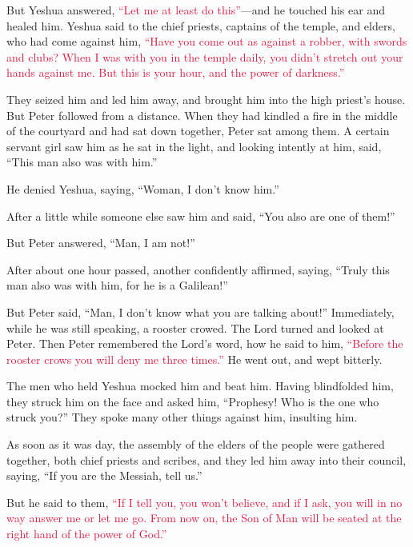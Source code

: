\myverse{}But Yeshua answered,
\textcolor{crimson}{“Let me at least do this”}—and he touched his ear and healed him.
\myverse{}Yeshua said to the chief priests, captains of the temple, and elders, who
had come against him,
\textcolor{crimson}{“Have you come out as against a robber, with swords and clubs?
}
\myverse{}\textcolor{crimson}{When I was with you in the temple daily, you didn’t stretch out your
	hands against me. But this is your hour, and the power of darkness.”
}

\myverse{}They seized him and led him away, and brought him into the high
priest’s house. But Peter followed from a distance.
\myverse{}When they had kindled a fire in the middle of the courtyard and had sat down
together, Peter sat among them.
\myverse{}A certain servant girl saw him as he sat in the light, and looking intently
at him, said, “This man also was with him.”

\myverse{}He denied Yeshua, saying, “Woman, I don’t know him.”

\myverse{}After a little while someone else saw him and said, “You also
are one of them!”

But Peter answered, “Man, I am not!”

\myverse{}After about one hour passed, another confidently affirmed, saying,
“Truly this man also was with him, for he is a Galilean!”

\myverse{}But Peter said, “Man, I don’t know what you are talking about!”
Immediately, while he was still speaking, a rooster crowed.
\myverse{}The Lord turned and looked at Peter. Then Peter remembered the Lord’s word,
how he said to him,
\textcolor{crimson}{“Before the rooster crows you will deny me three times.”}
\myverse{}He went out, and wept bitterly.

\myverse{}The men who held Yeshua mocked him and beat him.
\myverse{}Having blindfolded him, they struck him on the face and asked him, “Prophesy!
Who is the one who struck you?”
\myverse{}They spoke many other things against him, insulting him.

\myverse{}As soon as it was day, the assembly of the elders of the people
were gathered together, both chief priests and scribes, and they led him away into their council, saying,
\myverse{}“If you are the Messiah, tell us.”

But he said to them,
\textcolor{crimson}{“If I tell you, you won’t believe,
}
\myverse{}\textcolor{crimson}{and if I ask, you will in no way answer me or let me go.
}
\myverse{}\textcolor{crimson}{From now on, the Son of Man will be seated at the right hand of the power
	of God.”}

